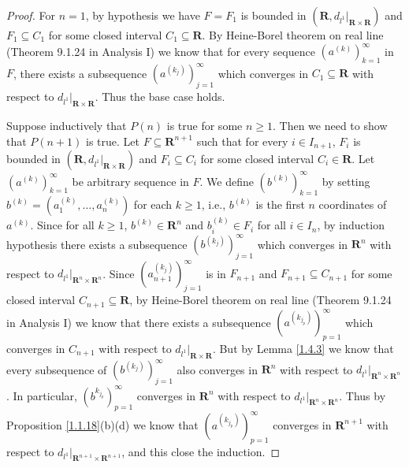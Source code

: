 \begin{proof}
    For \(n = 1\), by hypothesis we have \(F = F_1\) is bounded in \((\mathbf{R}, d_{l^1}|_{\mathbf{R} \times \mathbf{R}})\) and \(F_1 \subseteq C_1\) for some closed interval \(C_1 \subseteq \mathbf{R}\).
    By Heine-Borel theorem on real line (Theorem 9.1.24 in Analysis I) we know that for every sequence \((a^{(k)})_{k = 1}^\infty\) in \(F\), there exists a subsequence \((a^{(k_j)})_{j = 1}^\infty\) which converges in \(C_1 \subseteq \mathbf{R}\) with respect to \(d_{l^1}|_{\mathbf{R} \times \mathbf{R}}\).
    Thus the base case holds.

    Suppose inductively that \(P(n)\) is true for some \(n \geq 1\).
    Then we need to show that \(P(n + 1)\) is true.
    Let \(F \subseteq \mathbf{R}^{n + 1}\) such that for every \(i \in I_{n + 1}\), \(F_i\) is bounded in \((\mathbf{R}, d_{l^1}|_{\mathbf{R} \times \mathbf{R}})\) and \(F_i \subseteq C_i\) for some closed interval \(C_i \in \mathbf{R}\).
    Let \((a^{(k)})_{k = 1}^\infty\) be arbitrary sequence in \(F\).
    We define \((b^{(k)})_{k = 1}^\infty\) by setting \(b^{(k)} = (a_1^{(k)}, \dots, a_n^{(k)})\) for each \(k \geq 1\), i.e., \(b^{(k)}\) is the first \(n\) coordinates of \(a^{(k)}\).
    Since for all \(k \geq 1\), \(b^{(k)} \in \mathbf{R}^n\) and \(b_i^{(k)} \in F_i\) for all \(i \in I_n\), by induction hypothesis there exists a subsequence \((b^{(k_j)})_{j = 1}^\infty\) which converges in \(\mathbf{R}^n\) with respect to \(d_{l^1}|_{\mathbf{R}^n \times \mathbf{R}^n}\).
    Since \((a_{n + 1}^{(k_j)})_{j = 1}^\infty\) is in \(F_{n + 1}\) and \(F_{n + 1} \subseteq C_{n + 1}\) for some closed interval \(C_{n + 1} \subseteq \mathbf{R}\), by Heine-Borel theorem on real line (Theorem 9.1.24 in Analysis I) we know that there exists a subsequence \((a^{(k_{j_p})})_{p = 1}^\infty\) which converges in \(C_{n + 1}\) with respect to \(d_{l^1}|_{\mathbf{R} \times \mathbf{R}}\).
    But by Lemma \ref{1.4.3} we know that every subsequence of \((b^{(k_j)})_{j = 1}^\infty\) also converges in \(\mathbf{R}^n\) with respect to \(d_{l^1}|_{\mathbf{R}^n \times \mathbf{R}^n}\).
    In particular, \((b^{k_{j_p}})_{p = 1}^\infty\) converges in \(\mathbf{R}^n\) with respect to \(d_{l^1}|_{\mathbf{R}^n \times \mathbf{R}^n}\).
    Thus by Proposition \ref{1.1.18}(b)(d) we know that \((a^{(k_{j_p})})_{p = 1}^\infty\) converges in \(\mathbf{R}^{n + 1}\) with respect to \(d_{l^1}|_{\mathbf{R}^{n + 1} \times \mathbf{R}^{n + 1}}\), and this close the induction.


\end{proof}

